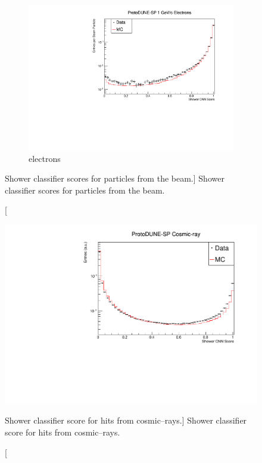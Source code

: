 \begin{figure}
	\begin{subfigure}[b]{0.7\textwidth}
		\centering
		\includegraphics[width=\textwidth]{figures/hit_cnn_electron.pdf}
		\caption {electrons}
		\label{fig:beam_electron_cnn}
	\end{subfigure}

	\caption
	[Shower classifier scores for particles from the \protodune{} beam.]
	{Shower classifier scores for particles from the \protodune{} beam.}

	\label{fig:cnn_scores_beam}

\end{figure}

\begin{figure}
	\centering
	\includegraphics[width=\textwidth]{figures/hit_cnn_cosmics.pdf}
	\caption
	[Shower classifier score for hits from cosmic--rays.]
	{Shower classifier score for hits from cosmic--rays.}
	\label{fig:cosmic_muon_cnn}
\end{figure}

